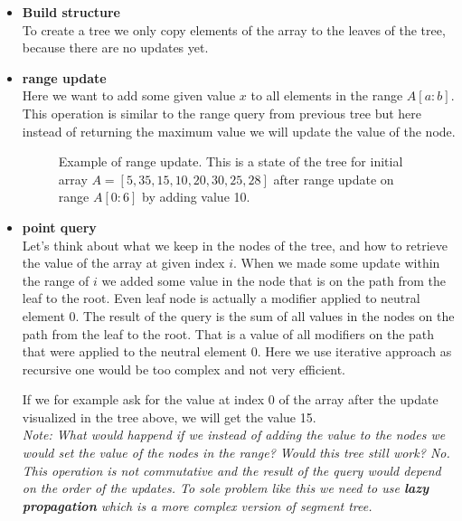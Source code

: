 \documentclass{article}
\begin{document}
\begin{itemize}
    \item \textbf{Build structure} \\
    To create a tree we only copy elements of the array to the leaves of the tree, 
    because there are no updates yet.
    \FloatBarrier
    \item \textbf{range update} \\
    Here we want to add some given value $x$ to all elements in the range $A[a:b]$.
    This operation is similar to the range query from previous tree but here instead of
    returning the maximum value we will update the value of the node.
    
    \begin{figure}[H]
        \centering
        
        \caption{Example of range update. This is a state of the tree for initial array $A = [5, 35, 15, 10, 20, 30, 25, 28]$ after range update on range $A[0:6]$ by adding value 10.}
    \end{figure}

    \item \textbf{point query} \\
    Let's think about what we keep in the nodes of the tree, and how to retrieve the value of the array at given index $i$.
    When we made some update within the range of $i$ we added some value in the node that is on the path from the leaf to the root.
    Even leaf node is actually a modifier applied to neutral element 0. The result of the query is the sum of all values in the nodes on the path from the leaf to the root.
    That is a value of all modifiers on the path that were applied to the neutral element 0.
    Here we use iterative approach as recursive one would be too complex and not very efficient.
    

    If we for example ask for the value at index 0 of the array after the update visualized in
    the tree above, we will get the value 15. \\
    \textit{Note: What would happend if we instead of adding the value to the nodes we would 
    set the value of the nodes in the range? Would this tree still work? No.
    This operation is not commutative and the result of the query would depend on the order of the updates.
    To sole problem like this we need to use \textbf{lazy propagation} which is a more complex version of segment tree.}
\end{itemize}
\end{document}
